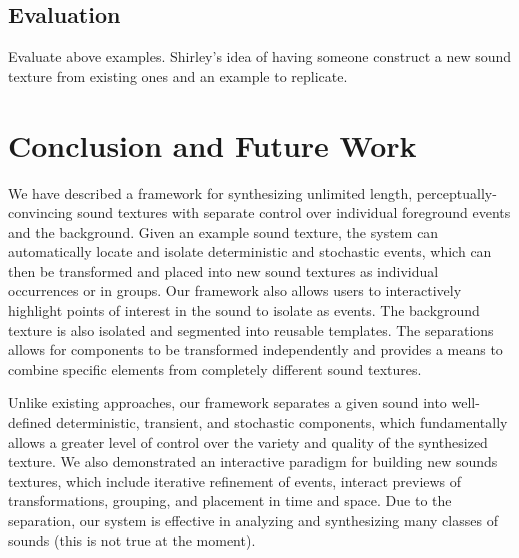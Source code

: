 \documentclass{acmsiggraph}               %
\begin{document}
\subsection{Evaluation}
Evaluate above examples.
Shirley's idea of having someone construct a new sound texture from existing
ones and an example to replicate. %





\section{Conclusion and Future Work}

We have described a framework for synthesizing unlimited length, perceptually-convincing 
sound textures with separate control over individual foreground events and the background.  
Given an example sound texture,  the system can automatically locate and isolate deterministic 
and stochastic events, which can then be transformed 
and placed into new sound textures as individual occurrences or in groups.  Our framework 
also allows users to interactively highlight points of interest in the sound to isolate as 
events.  The background texture is also isolated and segmented into reusable templates.  The 
separations allows for components to be transformed independently and provides a means to 
combine specific elements from completely different sound textures.

Unlike existing approaches, our framework separates a given sound into well-defined 
deterministic, transient, and stochastic components, which fundamentally allows a greater 
level of control over the variety and quality of the synthesized texture.
We also demonstrated an interactive paradigm for building new sounds textures, which include 
iterative refinement of events, interact previews of transformations, grouping, and placement 
in time and space.  Due to the separation, our system is effective in analyzing and 
synthesizing many classes of sounds (this is not true at the moment).
\end{document}
